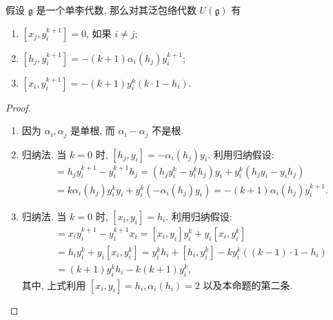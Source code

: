 \begin{proposition}
  假设 \( \mathfrak{g} \) 是一个单李代数, 那么对其泛包络代数 \( U(\mathfrak{g})
  \) 有
  \begin{enumerate}
    \item \( [x_j, y_i^{k + 1}] = 0 \), 如果 \( i \neq j \);
    \item \( [h_j, y_i^{k + 1}] = -(k + 1)\alpha_i(h_j)y^{k + 1}_i \);
    \item \( [x_i, y_i^{k + 1}] = -(k + 1)y_i^k(k\cdot 1 - h_i) \).
  \end{enumerate}
\end{proposition}
\begin{proof}
  \begin{enumerate}
    \item 因为 \( \alpha_i, \alpha_j \) 是单根, 而 \( \alpha_i - \alpha_j \)
      不是根.
    \item 归纳法. 当 \( k = 0 \) 时, \( [h_j, y_i] = -\alpha_i(h_j)y_i \).
      利用归纳假设:
      \begin{align*}
        [h_j, y_i^{k + 1}] &= h_j y_i^{k + 1} - y_i^{k + 1}h_j = (h_j y_i^k -
        y^k_i h_j)y_i + y^k_i(h_jy_i - y_i h_j)\\
                           &= k\alpha_i(h_j) y^k_i y_i +
        y^k_i(-\alpha_i(h_j)y_i) = -(k + 1) \alpha_i(h_j)y_i^{k + 1}.
      \end{align*}
    \item 归纳法. 当 \( k = 0 \) 时, \( [x_i, y_i] = h_i \).
      利用归纳假设:
      \begin{align*}
        [x_i, y_i^{k + 1}] &= x_i y_i^{k + 1} - y_i^{k + 1}x_i = [x_i, y_i]
        y_i^k + y_i[x_i, y_i^k]\\&= h_i y_i^k + y_i [x_i, y_i^k] = y_i^kh_i +
        [h_i, y_i^{k}] -ky^{k}_i((k - 1)\cdot 1- h_i)\\& = (k + 1)y^k_i h_i -
        k(k + 1)y_i^{k},
      \end{align*}
      其中, 上式利用 \( [x_i, y_i] = h_i, \alpha_i(h_i) = 2 \)
      以及本命题的第二条.
  \end{enumerate}
\end{proof}
